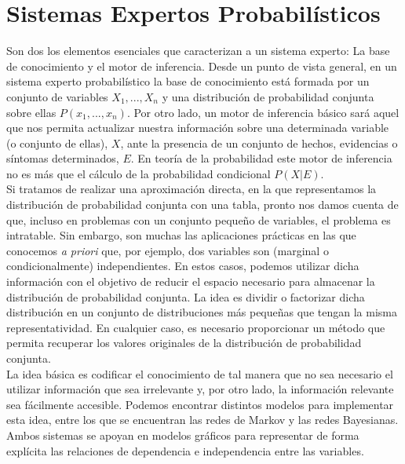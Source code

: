 \documentclass{article}
\theoremstyle{definition_wo_parentheses}
\begin{document}
\section{Sistemas Expertos Probabilísticos}
Son dos los elementos esenciales que caracterizan a un sistema experto: La base de conocimiento y el motor de inferencia. Desde un punto de vista general, en un sistema experto probabilístico la base de conocimiento está formada por un conjunto de variables $X_1,...,X_n$ y una distribución de probabilidad conjunta sobre ellas $P(x_1,...,x_n)$. Por otro lado, un motor de inferencia básico sará aquel que nos permita actualizar nuestra información sobre una determinada variable (o conjunto de ellas), $X$, ante la presencia de un conjunto de hechos, evidencias o síntomas determinados, $E$. En teoría de la probabilidad este motor de inferencia no es más que el cálculo de la probabilidad condicional $P(X|E)$.\\
Si tratamos de realizar una aproximación directa, en la que representamos la distribución de probabilidad conjunta con una tabla, pronto nos damos cuenta de que, incluso en problemas con un conjunto pequeño de variables, el problema es intratable. Sin embargo, son muchas las aplicaciones prácticas en las que conocemos \textit{a priori} que, por ejemplo, dos variables son (marginal o condicionalmente) independientes. En estos casos, podemos utilizar dicha información con el objetivo de reducir el espacio necesario para almacenar la distribución de probabilidad conjunta. La idea es dividir o factorizar dicha distribución en un conjunto de distribuciones más pequeñas que tengan la misma representatividad. En cualquier caso, es necesario proporcionar un método que permita recuperar los valores originales de la distribución de probabilidad conjunta.\\
La idea básica es codificar el conocimiento de tal manera que no sea necesario el utilizar información que sea irrelevante y, por otro lado, la información relevante sea fácilmente accesible. Podemos encontrar distintos modelos para implementar esta idea, entre los que se encuentran las redes de Markov y las redes Bayesianas. Ambos sistemas se apoyan en modelos gráficos para representar de forma explícita las relaciones de dependencia e independencia entre las variables.
\end{document}
